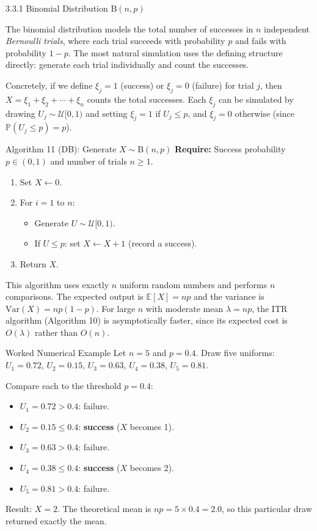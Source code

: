 \documentclass[aspectratio=169,10pt]{beamer}
\newcommand{\PP}{\mathbb{P}}
\newcommand{\EE}{\mathbb{E}}
\newcommand{\UU}{\mathcal{U}}
\begin{document}
\begin{frame}[allowframebreaks]{3.3.1 Binomial Distribution $\mathrm{B}(n,p)$}

The binomial distribution models the total number of successes in $n$ independent
\emph{Bernoulli trials}, where each trial succeeds with probability $p$ and fails
with probability $1-p$.  The most natural simulation uses the defining structure
directly: generate each trial individually and count the successes.

Concretely, if we define $\xi_j = 1$ (success) or $\xi_j = 0$ (failure) for
trial $j$, then $X = \xi_1 + \xi_2 + \cdots + \xi_n$ counts the total successes.
Each $\xi_j$ can be simulated by drawing $U_j \sim \UU[0,1)$ and setting
$\xi_j = 1$ if $U_j \le p$, and $\xi_j = 0$ otherwise (since $\PP(U_j \le p) = p$).

\begin{alertblock}{Algorithm 11 (DB): Generate $X \sim \mathrm{B}(n,p)$}
  \textbf{Require:} Success probability $p \in (0,1)$ and number of trials $n \ge 1$.
  \begin{enumerate}
    \item Set $X \leftarrow 0$.
    \item For $i = 1$ to $n$:
    \begin{itemize}
      \item Generate $U \sim \UU[0,1)$.
      \item If $U \le p$: set $X \leftarrow X + 1$ (record a success).
    \end{itemize}
    \item Return $X$.
  \end{enumerate}
  This algorithm uses exactly $n$ uniform random numbers and performs $n$
  comparisons.  The expected output is $\EE[X] = np$ and the variance is
  $\mathrm{Var}(X) = np(1-p)$.  For large $n$ with moderate mean
  $\lambda = np$, the ITR algorithm (Algorithm 10) is asymptotically faster,
  since its expected cost is $O(\lambda)$ rather than $O(n)$.
\end{alertblock}

\begin{exampleblock}{Worked Numerical Example}
  Let $n = 5$ and $p = 0.4$.  Draw five uniforms:
  $U_1 = 0.72$, $U_2 = 0.15$, $U_3 = 0.63$, $U_4 = 0.38$, $U_5 = 0.81$.

  Compare each to the threshold $p = 0.4$:
  \begin{itemize}
    \item $U_1 = 0.72 > 0.4$: failure.
    \item $U_2 = 0.15 \le 0.4$: \textbf{success} ($X$ becomes 1).
    \item $U_3 = 0.63 > 0.4$: failure.
    \item $U_4 = 0.38 \le 0.4$: \textbf{success} ($X$ becomes 2).
    \item $U_5 = 0.81 > 0.4$: failure.
  \end{itemize}
  Result: $X = 2$.  The theoretical mean is $np = 5 \times 0.4 = 2.0$, so
  this particular draw returned exactly the mean.
\end{exampleblock}

\end{frame}
\end{document}
